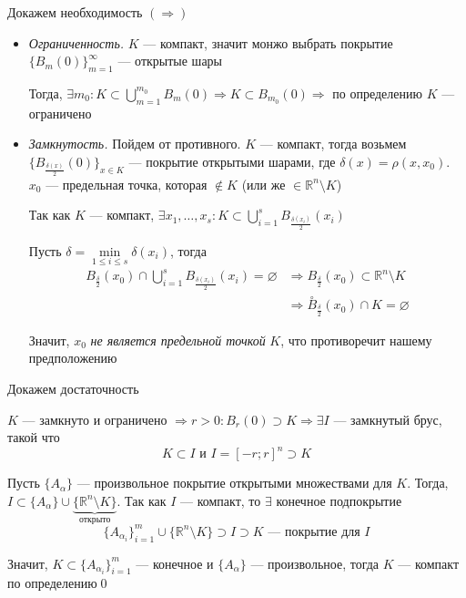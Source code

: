 \documentclass[a4paper]{article}
\begin{document}
\proof Докажем необходимость $(\Longrightarrow)$
\begin{itemize}
    \item \textit{Ограниченность.} $K$ — компакт, значит монжо выбрать покрытие $\{B_{m}(0)\}_{m=1}^{\infty}$ — открытые шары
    
    Тогда, $\exists m_0:K\subset \displaystyle\bigcup_{m=1}^{m_0} B_m(0)\Longrightarrow K\subset B_{m_0}(0)\Longrightarrow$ по определению $K$ — ограничено

    \item \textit{Замкнутость.} Пойдем от противного. $K$ — компакт, тогда возьмем $\{B_{\frac{\delta(x)}{2}}(0)\}_{x\in K}$ — покрытие открытыми шарами, где $\delta(x)=\rho(x,x_0)$. $x_0$ — предельная точка, которая $\notin K$ (или же $\in \mathbb{R}^n\setminus K$)
    
    Так как $K$ — компакт, $\exists x_1,\ldots, x_s:K\subset\displaystyle\bigcup_{i=1}^{s} B_{\frac{\delta(x_i)}{2}}(x_i)$

    Пусть $\delta=\min\limits_{1\leqslant i\leqslant s}{\delta(x_i)}$, тогда
    \begin{equation*}
        \begin{aligned}
            B_{\frac{\delta}{2}}(x_0)\cap\bigcup_{i=1}^{s}B_{\frac{\delta(x_i)}{2}}(x_i)=\varnothing&\Longrightarrow B_{\frac{\delta}{2}}(x_0)\subset\mathbb{R}^n\setminus K\\
            &\Longrightarrow\stackrel{\circ}{B}_{\frac{\delta}{2}}(x_0)\cap K=\varnothing
        \end{aligned}
    \end{equation*}

    Значит, $x_0$ \textit{не является предельной точкой} $K$, что противоречит нашему предположению
\end{itemize}

\proof Докажем достаточность

$K$ — замкнуто и ограничено $\Longrightarrow r>0:B_r(0)\supset K\Longrightarrow\exists I$ — замкнутый брус, такой что 
$$K\subset I\text{ и }I=[-r;r]^n\supset K$$

Пусть $\{A_{\alpha}\}$ — произвольное покрытие открытыми множествами для $K$. Тогда, $I\subset \{A_{\alpha}\}\cup\underbrace{\{\mathbb{R}^n\setminus K\}}_{\text{открыто}}$. Так как $I$ — компакт, то $\exists $ конечное подпокрытие 
$$\{A_{\alpha_i}\}_{i=1}^m\cup\{\mathbb{R}^n\setminus K\}\supset I\supset K\text{ — покрытие для $I$}$$

Значит, $K\subset\{A_{\alpha_i}\}_{i=1}^{m}$ — конечное и $\{A_{\alpha}\}$ — произвольное, тогда $K$ — компакт по определению\qed
\end{document}

